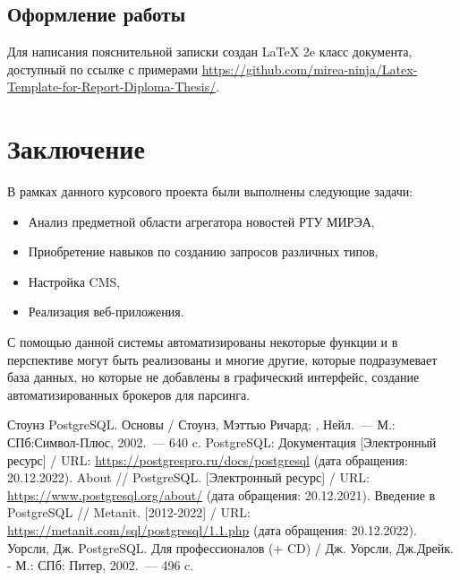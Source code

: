 \documentclass{mirea}
\begin{document}
	
	\subsection{Оформление работы}
	
	Для написания пояснительной записки создан \LaTeX{} 2e класс документа, доступный по ссылке с примерами \url{https://github.com/mirea-ninja/Latex-Template-for-Report-Diploma-Thesis/}.
	
	
	\section*{Заключение}
	
	В рамках данного курсового проекта были выполнены следующие задачи:
	\begin{itemize}
		\item Анализ предметной области агрегатора новостей РТУ МИРЭА,
		\item Приобретение навыков по созданию запросов различных типов,
		\item Настройка CMS,
		\item Реализация веб-приложения.
	\end{itemize}
	

	С помощью данной системы автоматизированы некоторые функции и в перспективе могут быть реализованы и многие другие, которые подразумевает база данных, но которые не добавлены в графический интерфейс, создание автоматизированных брокеров для парсинга.
	
	
	
	\begin{thebibliography}{99\kern\bibindent}
		 Стоунз PostgreSQL. Основы / Стоунз, Мэттью Ричард; , Нейл.~---
		М.: СПб:Символ-Плюс, 2002.~--- 640 c.
		 PostgreSQL: Документация [Электронный ресурс] / URL:
		\url{https://postgrespro.ru/docs/postgresql} (дата обращения: 20.12.2022).
		 About // PostgreSQL. [Электронный ресурс] / URL:
		\url{https://www.postgresql.org/about/} (дата обращения: 20.12.2021).
		 Введение в PostgreSQL // Metanit. [2012-2022] / URL:
		\url{https://metanit.com/sql/postgresql/1.1.php} (дата обращения: 20.12.2022).
		 Уорсли, Дж. PostgreSQL. Для профессионалов (+ CD) / Дж.
		Уорсли, Дж.Дрейк. - М.: СПб: Питер, 2002.~--- 496 c.
	\end{thebibliography}
	
	
	
	
\end{document}
